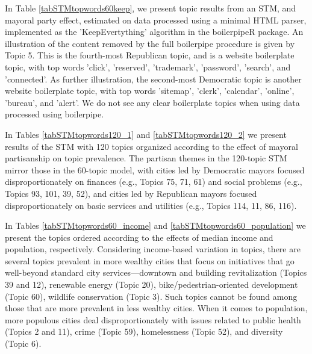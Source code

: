\documentclass[11pt]{article}
\begin{document}
In Table \ref{tabSTMtopwords60keep}, we present topic results from an STM, and mayoral party effect, estimated on data processed using a minimal HTML parser, implemented as the 'KeepEvertything' algorithm in the boilerpipeR package. An illustration of the content removed by the full boilerpipe procedure is given by Topic 5. This is the fourth-most Republican topic, and is a website boilerplate topic, with top words 'click', 'reserved', 'trademark', 'password', 'search', and 'connected'.  As further illustration, the second-most Democratic topic is another website boilerplate topic, with top words 'sitemap', 'clerk', 'calendar', 'online', 'bureau', and 'alert'. We do not see any clear boilerplate topics when using data processed using boilerpipe.



In Tables \ref{tabSTMtopwords120_1} and \ref{tabSTMtopwords120_2} we present results of the STM with 120 topics organized according to the effect of mayoral partisanship on topic prevalence. The partisan themes in the 120-topic STM mirror those in the 60-topic model, with cities led by Democratic mayors focused disproportionately on finances (e.g., Topics 75, 71, 61) and social problems (e.g., Topics 93, 101, 39, 52), and cities led by Republican mayors focused disproportionately on basic services and utilities (e.g., Topics 114, 11,  86, 116).





In Tables \ref{tabSTMtopwords60_income} and \ref{tabSTMtopwords60_population} we present the topics ordered according to the effects of median income and population, respectively. Considering income-based variation in topics, there are several topics prevalent in more wealthy cities that focus on initiatives that go well-beyond standard city services---downtown and building revitalization (Topics 39 and 12), renewable energy (Topic 20), bike/pedestrian-oriented development (Topic 60), wildlife conservation (Topic 3). Such topics cannot be found among those that are more prevalent in less wealthy cities. When it comes to population, more populous cities deal disproportionately with issues related to public health (Topics  2 and 11), crime (Topic 59), homelessness (Topic 52), and diversity (Topic 6).




\end{document}
